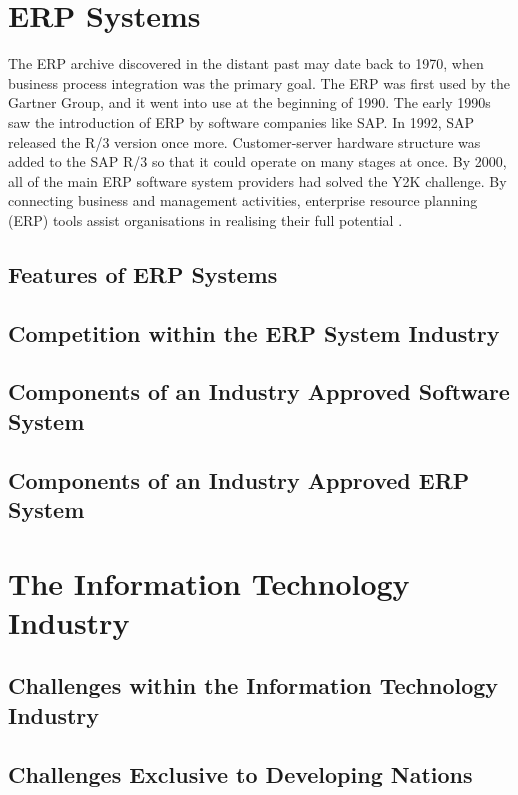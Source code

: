 \section{ERP Systems}
\par{The ERP archive discovered in the distant past may date back to 1970, when business process 
integration was the primary goal. The ERP was first used by the Gartner Group, and it went into 
use at the beginning of 1990. The early 1990s saw the introduction of ERP by software companies 
like SAP. In 1992, SAP released the R/3 version once more. Customer-server hardware structure was
 added to the SAP R/3 so that it could operate on many stages at once. By 2000, all of the main 
 ERP software system providers had solved the Y2K challenge. By connecting business and management 
 activities, enterprise resource planning (ERP) tools assist organisations in realising their full 
 potential \citep{uccakturk2013effects}.}

\subsection{Features of ERP Systems}
\subsection{Competition within the ERP System Industry}
\subsection{Components of an Industry Approved Software System}
\subsection{Components of an Industry Approved ERP System}
\section{The Information Technology Industry}
\subsection{Challenges within the Information Technology Industry}
\subsection{Challenges Exclusive to Developing Nations}
